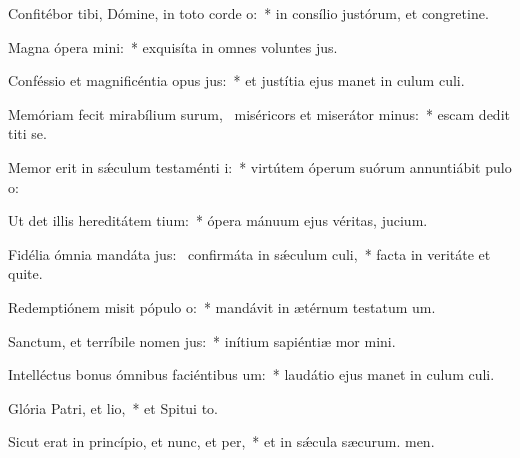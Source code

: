 \item Confitébor tibi, Dómine, in toto corde o:~* in consílio justórum, et congretine.
\item Magna ópera mini:~* exquisíta in omnes voluntes jus.
\item Conféssio et magnificéntia opus jus:~* et justítia ejus manet in culum culi.
\item Memóriam fecit mirabílium surum,~\pscross{} miséricors et miserátor minus:~* escam dedit titi se.
\item Memor erit in sǽculum testaménti i:~* virtútem óperum suórum annuntiábit pulo o:
\item Ut det illis hereditátem tium:~* ópera mánuum ejus véritas,  jucium.
\item Fidélia ómnia mandáta jus:~\pscross{} confirmáta in sǽculum culi,~* facta in veritáte et quite.
\item Redemptiónem misit pópulo o:~* mandávit in ætérnum testatum um.
\item Sanctum, et terríbile nomen jus:~* inítium sapiéntiæ mor mini.
\item Intelléctus bonus ómnibus faciéntibus um:~* laudátio ejus manet in culum culi.
\item Glória Patri, et lio,~* et Spitui to.
\item Sicut erat in princípio, et nunc, et per,~* et in sǽcula sæcurum. men.
